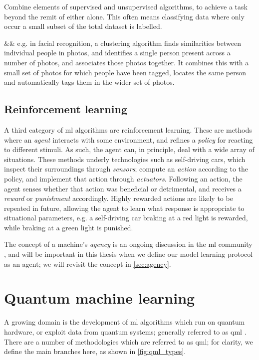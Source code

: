 \begin{description}
    Combine elements of supervised and unsupervised algorithms, 
        to achieve a task beyond the remit of either alone. 
        This often means classifying data where only occur a small subset of the total dataset is labelled. 
    \begin{easylist}
        && e.g. in facial recognition, a clustering algorithm finds similarities between individual people in photos, 
            and identifies a single person present across a number of photos, and associates those photos together. 
            It combines this with a small set of photos for which people have been tagged, 
                locates the same person and automatically tags them in the wider set of photos. 
    \end{easylist}
\end{description}
\par 

\subsection{Reinforcement learning}
A third category of \gls{ml} algorithms are reinforcement learning.
These are methods where an \emph{agent} interacts with some environment, 
    and refines a \emph{policy} for reacting to different stimuli. 
As such, the agent can, in principle, deal with a wide array of situations. 
These methods underly technologies such as self-driving cars, 
    which inspect their surroundings through \emph{sensors};
    compute an \emph{action} according to the policy, 
    and implement that action through \emph{actuators}.
Following an action, the agent senses whether that action was beneficial or detrimental, 
    and receives a \emph{reward} or \emph{punishment} accordingly. 
Highly rewarded actions are likely to be repeated in future, allowing the agent to learn what response is 
    appropriate to situational parameters, 
    e.g. a self-driving car braking at a red light is rewarded, 
    while braking at a green light is punished. 
\par 
The concept of a machine's \emph{agency} is an ongoing discussion in the \gls{ml} community \cite{franklin1996agent, wooldridge2009introduction}, 
    and will be important in this thesis when we define our model learning protocol as an agent;
    we will revisit the concept in \cref{sec:agency}.

\section{Quantum machine learning}\label{sec:quantum_machine_learning}
A growing domain is the development of \gls{ml} algorithms which run on quantum hardware, 
    or exploit data from quantum systems; generally referred to as \acrfull{qml} \cite{biamonte2017quantum, adcock2015advances}. 
There are a number of methodologies which are referred to as \gls{qml};
    for clarity, we define the main branches here, as shown in \cref{fig:qml_types}. 

